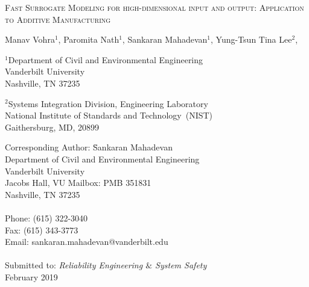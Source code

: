 \begin{center}
\textsc{Fast Surrogate Modeling for high-dimensional input and output:
Application to Additive Manufacturing}

\bigskip 
\bigskip 

Manav Vohra$^1$, Paromita Nath$^1$, Sankaran Mahadevan$^1$,
Yung-Tsun Tina Lee$^2$,

\bigskip
\bigskip

\normalsize
$^1$Department of Civil and Environmental Engineering\\
Vanderbilt University\\
Nashville, TN 37235\\

\bigskip

$^2$Systems Integration Division, Engineering Laboratory\\
National Institute of Standards and Technology~(NIST)\\
Gaithersburg, MD, 20899

\end{center}

\vspace{6cm}

\begin{tabbing}
Corresponding Author: \hspace{5mm} \= Sankaran Mahadevan\\
       \>  Department of Civil and Environmental Engineering\\
       \>  Vanderbilt University\\
        Jacobs Hall, VU Mailbox: PMB 351831 \\
       \>  Nashville, TN 37235 \\
       \> \\
Phone: \> (615) 322-3040 \\
Fax:   \> (615) 343-3773 \\
Email: \>  sankaran.mahadevan@vanderbilt.edu   \\
\\
Submitted to: \> \textit{Reliability Engineering $\&$ System Safety} \\
\>  February 2019\\

\bigskip
\end{tabbing}

\clearpage

